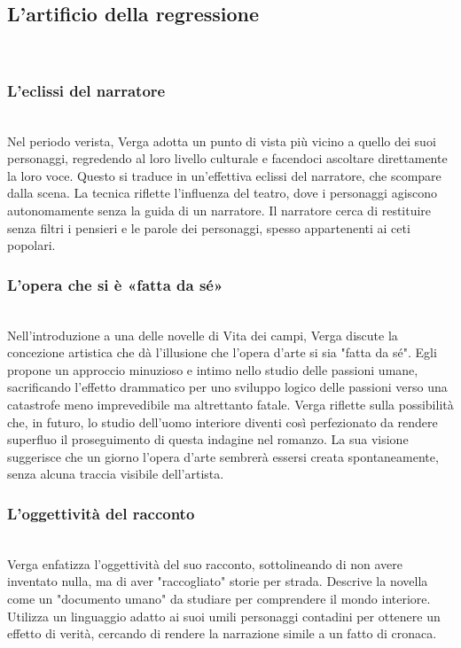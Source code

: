 \documentclass{report}
\begin{document}
\subsection{L'artificio della regressione} 
\\
\subsubsection{L’eclissi del narratore}
\\
Nel periodo verista, Verga adotta un punto di vista più vicino a quello dei suoi personaggi, regredendo al loro livello culturale e facendoci ascoltare direttamente la loro voce. Questo si traduce in un'effettiva eclissi del narratore, che scompare dalla scena. La tecnica riflette l'influenza del teatro, dove i personaggi agiscono autonomamente senza la guida di un narratore. Il narratore cerca di restituire senza filtri i pensieri e le parole dei personaggi, spesso appartenenti ai ceti popolari.
\\
\subsubsection{L’opera  che  si  è  «fatta  da  sé»}
\\
Nell'introduzione a una delle novelle di Vita dei campi, Verga discute la concezione artistica che dà l'illusione che l'opera d'arte si sia "fatta da sé". Egli propone un approccio minuzioso e intimo nello studio delle passioni umane, sacrificando l'effetto drammatico per uno sviluppo logico delle passioni verso una catastrofe meno imprevedibile ma altrettanto fatale. Verga riflette sulla possibilità che, in futuro, lo studio dell'uomo interiore diventi così perfezionato da rendere superfluo il proseguimento di questa indagine nel romanzo. La sua visione suggerisce che un giorno l'opera d'arte sembrerà essersi creata spontaneamente, senza alcuna traccia visibile dell'artista.
\\
\subsubsection{L’oggettività del racconto}
\\
Verga enfatizza l'oggettività del suo racconto, sottolineando di non avere inventato nulla, ma di aver "raccogliato" storie per strada. Descrive la novella come un "documento umano" da studiare per comprendere il mondo interiore. Utilizza un linguaggio adatto ai suoi umili personaggi contadini per ottenere un effetto di verità, cercando di rendere la narrazione simile a un fatto di cronaca.
\\
\end{document}
